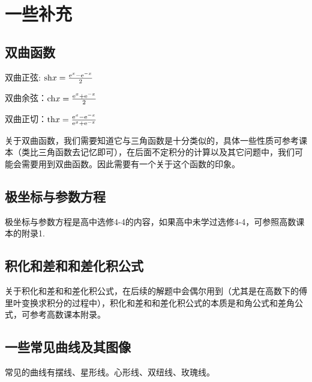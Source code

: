 \section{一些补充}
\subsection{双曲函数}

双曲正弦: ${\rm sh} x=\frac{{\rm e}^x-{\rm e}^{-x}}{2}$

双曲余弦：${\rm ch} x=\frac{{\rm e}^x+{\rm e}^{-x}}{2}$

双曲正切：${\rm th} x=\frac{{\rm e}^x-{\rm e}^{-x}}{{\rm e}^x+{\rm e}^{-x}}$
\begin{remark}
	关于双曲函数，我们需要知道它与三角函数是十分类似的，具体一些性质可参考课本（类比三角函数去记忆即可），在后面不定积分的计算以及其它问题中，我们可能会需要用到双曲函数。因此需要有一个关于这个函数的印象。
\end{remark}

\subsection{极坐标与参数方程}

极坐标与参数方程是高中选修4-4的内容，如果高中未学过选修4-4，可参照高数课本的附录1.

\subsection{积化和差和和差化积公式}

关于积化和差和和差化积公式，在后续的解题中会偶尔用到（尤其是在高数下的傅里叶变换求积分的过程中），积化和差和和差化积公式的本质是和角公式和差角公式，可参考高数课本附录。

\subsection{一些常见曲线及其图像}

常见的曲线有摆线、星形线。心形线、双纽线、玫瑰线。